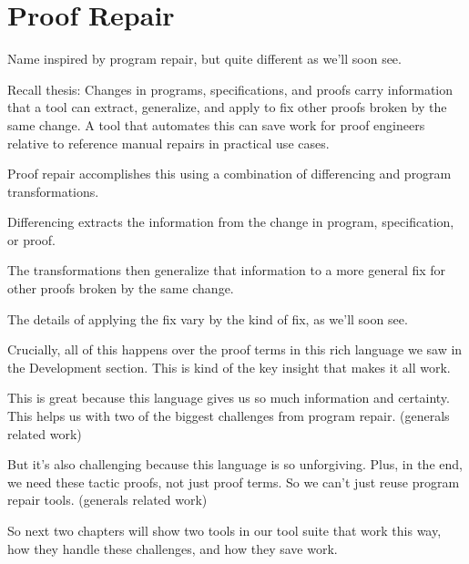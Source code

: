 \section{Proof Repair}

Name inspired by program repair, but quite different as we'll soon see.

Recall thesis: Changes in programs, specifications, and proofs carry information that a tool can extract, generalize, and apply to fix other proofs broken by the same change. A tool that automates this can save work for proof engineers relative to reference manual repairs in practical use cases.

Proof repair accomplishes this using a combination of differencing and program transformations.

Differencing extracts the information from the change in program, specification, or proof.

The transformations then generalize that information to a more general fix for other proofs broken by the same change.

The details of applying the fix vary by the kind of fix, as we'll soon see.

Crucially, all of this happens over the proof terms in this rich language we saw in the Development section. This is kind of the key insight that makes it all work.

This is great because this language gives us so much information and certainty. This helps us with two of the biggest challenges from program repair. (generals related work)

But it's also challenging because this language is so unforgiving. Plus, in the end, we need these tactic proofs, not just proof terms. So we can't just reuse program repair tools. (generals related work)

So next two chapters will show two tools in our tool suite that work this way, how they handle these challenges, and how they save work.
